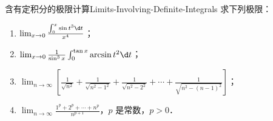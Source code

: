 \begin{problem}{含有定积分的极限计算}{Limits-Involving-Definite-Integrals}
    求下列极限：
    \begin{enumerate}
        \item $\lim_{x\to 0} \frac{\int_0^x \sin t^3 \d t}{x^4}$；
        \item $\lim_{x\to 0} \frac{1}{\sin^3 x} \int_0^{\tan x} \arcsin t^2 \d t$；
        \item $\lim_{n\to\infty} \left[ \frac{1}{\sqrt{n^2}} + \frac{1}{\sqrt{n^2 - 1^2}} + \frac{1}{\sqrt{n^2 - 2^2}} + \cdots + \frac{1}{\sqrt{n^2 - (n-1)^2}} \right]$；
        \item $\lim_{n\to\infty} \frac{1^p + 2^p + \cdots + n^p}{n^{p+1}}$，$p$ 是常数，$p > 0$．
    \end{enumerate}
\end{problem}

